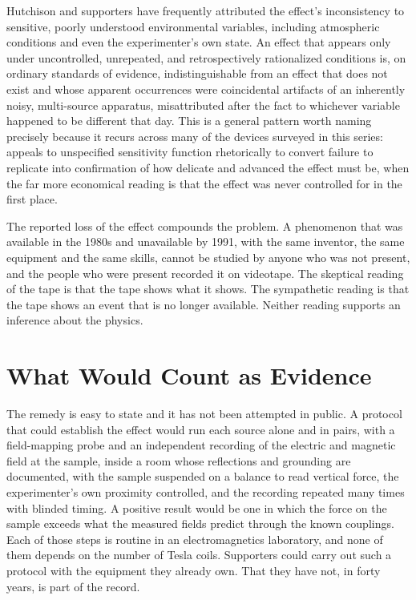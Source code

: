 \documentclass[11pt]{article}
\begin{document}
Hutchison and supporters have frequently attributed the effect's inconsistency to sensitive, poorly understood environmental variables, including atmospheric conditions and even the experimenter's own state. An effect that appears only under uncontrolled, unrepeated, and retrospectively rationalized conditions is, on ordinary standards of evidence, indistinguishable from an effect that does not exist and whose apparent occurrences were coincidental artifacts of an inherently noisy, multi-source apparatus, misattributed after the fact to whichever variable happened to be different that day. This is a general pattern worth naming precisely because it recurs across many of the devices surveyed in this series: appeals to unspecified sensitivity function rhetorically to convert failure to replicate into confirmation of how delicate and advanced the effect must be, when the far more economical reading is that the effect was never controlled for in the first place.

The reported loss of the effect compounds the problem. A phenomenon that was available in the 1980s and unavailable by 1991, with the same inventor, the same equipment and the same skills, cannot be studied by anyone who was not present, and the people who were present recorded it on videotape. The skeptical reading of the tape is that the tape shows what it shows. The sympathetic reading is that the tape shows an event that is no longer available. Neither reading supports an inference about the physics.

\section{What Would Count as Evidence}

The remedy is easy to state and it has not been attempted in public. A protocol that could establish the effect would run each source alone and in pairs, with a field-mapping probe and an independent recording of the electric and magnetic field at the sample, inside a room whose reflections and grounding are documented, with the sample suspended on a balance to read vertical force, the experimenter's own proximity controlled, and the recording repeated many times with blinded timing. A positive result would be one in which the force on the sample exceeds what the measured fields predict through the known couplings. Each of those steps is routine in an electromagnetics laboratory, and none of them depends on the number of Tesla coils. Supporters could carry out such a protocol with the equipment they already own. That they have not, in forty years, is part of the record.
\end{document}
